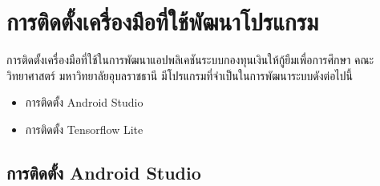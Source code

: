 \chapter{การติดตั้งเครื่องมือที่ใช้พัฒนาโปรแกรม}
การติดตั้งเครื่องมือที่ใช้ในการพัฒนาแอปพลิเคชันระบบกองทุนเงินให้กู้ยืมเพื่อการศึกษา คณะวิทยาศาสตร์ มหาวิทยาลัยอุบลราชธานี มีโปรแกรมที่จำเป็นในการพัฒนาระบบดังต่อไปนี้
\begin{itemize}
	\item การติดตั้ง Android Studio
	\item การติดตั้ง Tensorflow Lite
\end{itemize}

\section{การติดตั้ง Android Studio}
